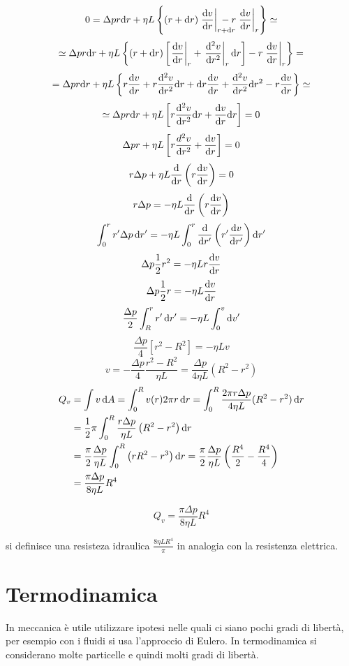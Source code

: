 \[0=\Delta p r\ud r+\eta L\left\{(r+\ud r)\left.\frac{\ud v}{\ud r}\right|_{r+\ud r}\!\!\!\!\!\!\!\!\!\!-r\left.\frac{\ud v}{\ud r}\right|_r\right\}\simeq\]
\[\simeq\Delta p r\mathrm{d} r+\eta L\left\{(r+\mathrm{d} r)\left[\left.\frac{\mathrm{d} v}{\mathrm{d} r}\right|_r+\left.\frac{\mathrm{d}^2 v}{\mathrm{d} r^2}\right|_r\mathrm{d} r\right]-r\left.\frac{\mathrm{d} v}{\mathrm{d} r}\right|_r\right\}=\]
\[=\Delta p r\mathrm{d} r+\eta L\left\{r\frac{\mathrm{d} v}{\mathrm{d} r}+r\frac{\mathrm{d}^2 v}{\mathrm{d} r^2}\mathrm{d} r+\mathrm{d} r\frac{\mathrm{d} v}{\mathrm{d} r}+\frac{\mathrm{d}^2 v}{\mathrm{d} r^2}\mathrm{d} r^2-r\frac{\mathrm{d} v}{\mathrm{d} r}\right\}\simeq\]
\[\simeq\Delta p r \mathrm{d} r+\eta L\left[r\frac{\mathrm{d}^2 v}{\mathrm{d} r^2}\mathrm{d} r+\frac{\mathrm{d} v}{\mathrm{d} r}\mathrm{d} r\right]=0\]
\[\Delta p r+\eta L\left[r\frac{d^2 v}{\mathrm{d} r^2}+\frac{\mathrm{d} v}{\mathrm{d} r}\right]=0\]
\[r\Delta p+\eta L\frac{\mathrm{d}}{\mathrm{d} r}\left(r \frac{\mathrm{d} v}{\mathrm{d} r}\right)=0\]
\[r\Delta p=-\eta L\frac{\mathrm{d}}{\mathrm{d} r}\left(r\frac{\mathrm{d} v}{\mathrm{d} r}\right)\]
\[\int_0^r r'\Delta p\,\mathrm{d} r'=-\eta L\int_0^r\frac{\mathrm{d}}{\mathrm{d} r'}\left(r'\frac{\mathrm{d} v}{\mathrm{d} r'}\right)\mathrm{d} r'\]
\[\Delta p\frac{1}{2}r^2=-\eta L r\frac{\mathrm{d} v}{\mathrm{d} r}\]
\[\Delta p\frac{1}{2}r=-\eta L \frac{\mathrm{d} v}{\mathrm{d} r}\]
\[\frac{\Delta p}{2}\int_R^r r'\,\mathrm{d} r'=-\eta L\int_0^v \mathrm{d} v'\]
\[\frac{\Delta p}{4}\left[r^2-R^2\right]=-\eta Lv\]
\[v=-\frac{\Delta p}{4}\frac{r^2-R^2}{\eta L}=\frac{\Delta p}{4\eta L}\left(R^2-r^2\right)\]
\begin{align*}
   Q_v & =\int v \,\mathrm{d} A=\int_0^R v(r)2\pi r\,\mathrm{d} r=\int_0^R\frac{2\pi r\Delta p}{4\eta L}(R^2-r^2)\,\mathrm{d} r                                                     \\
       & =\frac{1}{2}\pi\int_0^R\frac{r\Delta p}{\eta L}\left(R^2-r^2\right)\mathrm{d} r                                                                              \\
       & =\frac{\pi}{2}\frac{\Delta p}{\eta L}\int_0^R \left(rR^2-r^3\right)\mathrm{d} r=\frac{\pi}{2}\frac{\Delta p}{\eta L}\left(\frac{R^4}{2}-\frac{R^4}{4}\right) \\
       & =\frac{\pi\Delta p}{8\eta L}R^4
\end{align*}
\begin{legge}[Poiseuille]
   \begin{equation}
      Q_v=\frac{\pi\Delta p}{8\eta L}R^4
   \end{equation}
\end{legge}
si definisce una resisteza idraulica $\frac{8\eta L R^4}{\pi}$ in analogia con la resistenza elettrica.


\chapter{Termodinamica}
\minitoc
In meccanica è utile utilizzare ipotesi nelle quali ci siano pochi gradi di libertà, per esempio con i fluidi si usa l'approccio di Eulero. In termodinamica si considerano molte particelle e quindi molti gradi di libertà.

